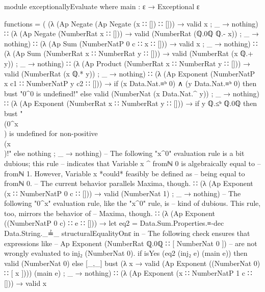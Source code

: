 \documentclass{report}
\begin{document}
\begin{code}
  module exceptionallyEvaluate where
    main : ε → Exceptional ε

    functions =
      ( (λ { (Ap Negate (Ap Negate (x ∷ []) ∷ [])) → valid x
           ; _ → nothing})
      ∷ (λ { (Ap Negate (NumberRat x ∷ [])) → valid (NumberRat (ℚ.0ℚ ℚ.- x))
           ; _ → nothing})
      ∷ (λ { (Ap Sum (NumberNatP 0 c ∷ x ∷ [])) → valid x
           ; _ → nothing})
      ∷ (λ { (Ap Sum (NumberRat x ∷ NumberRat y ∷ [])) →
             valid (NumberRat (x ℚ.+ y))
           ; _ → nothing})
      ∷ (λ { (Ap Product (NumberRat x ∷ NumberRat y ∷ [])) →
             valid (NumberRat (x ℚ.* y))
           ; _ → nothing})
      ∷ (λ { (Ap Exponent (NumberNatP x c1 ∷ NumberNatP y c2 ∷ [])) →
             if (x Data.Nat.≡ᵇ 0) ∧ (y Data.Nat.≡ᵇ 0)
               then bust "0^0 is undefined!"
               else valid (NumberNat (x Data.Nat.^ y))
           ; _ → nothing})
      ∷ (λ { (Ap Exponent (NumberRat x ∷ NumberRat y ∷ [])) →
             if y ℚ.≤ᵇ ℚ.0ℚ
                then bust "\\(0^x\\) is undefined for non-positive \\(x\\)!"
                else nothing
           ; _ → nothing})
      -- The following "x^0" evaluation rule is a bit dubious; this rule
      -- indicates that Variable x ^ fromℕ 0 is algebraically equal to
      -- fromℕ 1.  However, Variable x *could* feasibly be defined as
      -- being equal to fromℕ 0.
      -- The current behavior parallels Maxima, though.
      ∷ (λ { (Ap Exponent (x ∷ NumberNatP 0 c ∷ [])) → valid (NumberNat 1)
           ; _ → nothing})
      -- The following "0^x" evaluation rule, like the "x^0" rule, is
      -- kind of dubious.  This rule, too, mirrors the behavior of
      -- Maxima, though.
      ∷ (λ { (Ap Exponent ((NumberNatP 0 c) ∷ e ∷ [])) →
             let eq2 = Data.Sum.Properties.≡-dec Data.String._≟_
                                                 structuralEqualityOnε in
             -- The following check ensures that expressions like
             -- Ap Exponent (NumberRat ℚ.0ℚ ∷ [ NumberNat 0 ])
             -- are not wrongly evaluated to inj₂ (NumberNat 0).
             if isYes (eq2 (inj₂ e) (main e))
                then valid (NumberNat 0)
                else [_,_] bust
                           (λ x → valid (Ap Exponent ((NumberNat 0) ∷ [ x ])))
                           (main e)
           ; _ → nothing})
      ∷ (λ { (Ap Exponent (x ∷ NumberNatP 1 c ∷ [])) → valid x
}
\end{code}
\end{document}
